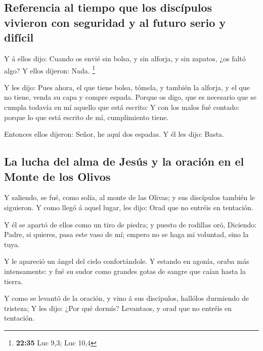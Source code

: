 \hypertarget{referencia-al-tiempo-que-los-discuxedpulos-vivieron-con-seguridad-y-al-futuro-serio-y-difuxedcil}{%
\subsection{Referencia al tiempo que los discípulos vivieron con
seguridad y al futuro serio y
difícil}\label{referencia-al-tiempo-que-los-discuxedpulos-vivieron-con-seguridad-y-al-futuro-serio-y-difuxedcil}}

 Y á ellos dijo: Cuando os envié sin bolsa, y sin alforja,
y sin zapatos, ¿os faltó algo? Y ellos dijeron: Nada. \footnote{\textbf{22:35}
  Luc 9,3; Luc 10,4}

 Y les dijo: Pues ahora, el que tiene bolsa, tómela, y
también la alforja, y el que no tiene, venda su capa y compre espada.
 Porque os digo, que es necesario que se cumpla todavía en
mí aquello que está escrito: Y con los malos fué contado: porque lo que
está escrito de mí, cumplimiento tiene.

 Entonces ellos dijeron: Señor, he aquí dos espadas. Y él
les dijo: Basta.

\hypertarget{la-lucha-del-alma-de-jesuxfas-y-la-oraciuxf3n-en-el-monte-de-los-olivos}{%
\subsection{La lucha del alma de Jesús y la oración en el Monte de los
Olivos}\label{la-lucha-del-alma-de-jesuxfas-y-la-oraciuxf3n-en-el-monte-de-los-olivos}}

 Y saliendo, se fué, como solía, al monte de las Olivas; y
sus discípulos también le siguieron.  Y como llegó á aquel
lugar, les dijo: Orad que no entréis en tentación.

 Y él se apartó de ellos como un tiro de piedra; y puesto
de rodillas oró,  Diciendo: Padre, si quieres, pasa este
vaso de mí; empero no se haga mi voluntad, sino la tuya.

 Y le apareció un ángel del cielo confortándole.
 Y estando en agonía, oraba más intensamente: y fué su
sudor como grandes gotas de sangre que caían hasta la tierra.

 Y como se levantó de la oración, y vino á sus discípulos,
hallólos durmiendo de tristeza;  Y les dijo: ¿Por qué
dormís? Levantaos, y orad que no entréis en tentación.

